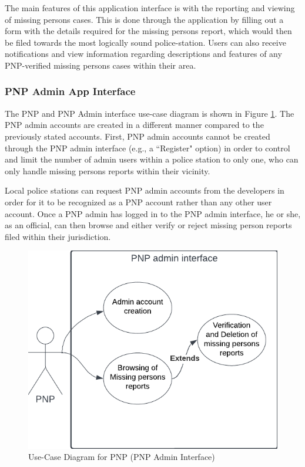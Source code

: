 The main features of this application interface is with the reporting and viewing of missing persons cases. This is done through the application by filling out a form with the details required for the missing persons report, which would then be filed towards the most logically sound police-station. Users can also receive notifications and view information regarding  descriptions and features of any PNP-verified missing persons cases within their area.

\subsubsection{PNP Admin App Interface}

The PNP and PNP Admin interface use-case diagram is shown in Figure \ref{fig:UseCasePNP}. The PNP admin accounts are created in a different manner compared to the previously stated accounts. First, PNP admin accounts cannot be created through the PNP admin interface (e.g., a ``Register" option) in order to control and limit the number of admin users within a police station to only one, who can only handle missing persons reports within their vicinity. 

Local police stations can request PNP admin accounts from the developers in order for it to be recognized as a PNP account rather than any other user account. Once a PNP admin has logged in to the PNP admin interface, he or she, as an official, can then browse and either verify or reject missing person reports filed within their jurisdiction.
\begin{figure}[!h]
    \centering
    \includegraphics[scale=0.5]{figures/Chapter3/Chapt3_UseCase_PNP.png}
    \caption{Use-Case Diagram for PNP (PNP Admin Interface)}
    \label{fig:UseCasePNP}
\end{figure}


